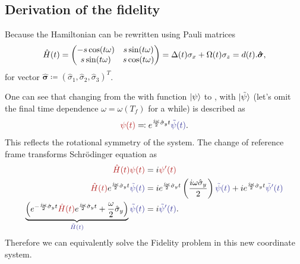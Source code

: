 \subsection{Derivation of the fidelity}
Because the Hamiltonian can be rewritten using Pauli matrices
\begin{equation}
    \hat{H}(t) = 
        \begin{pmatrix}
         -s \cos (t \omega ) & s \sin (t \omega ) \\
         s \sin (t \omega ) & s \cos (t \omega ) \\
        \end{pmatrix}
        =\Delta(t)\sigma_x+ \Omega(t)\sigma_z= d(t).\mathbf{\hat{\bm\sigma}},
\end{equation}
for vector $\hat{\bm\sigma}\coloneqq (\hat\sigma_1,\hat\sigma_2,\hat\sigma_3)^T$.

One can see that changing from the  with function $\ket{\psi}$ to , with $\ket{\tilde\psi}$ (let's omit the final time dependence $\omega=\omega(T_f)$ for a while) is described as
\begin{equation}
    \redd{\psi(t)} \eqqcolon \expsp \bluee{\tilde\psi(t)}.
\end{equation}
This reflects the rotational symmetry of the system. The change of reference frame transforms Schr\"odinger equation as
\begin{equation}
    \begin{split}
        \redd{\HH(t)\psi(t)} &= i\redd{\psi'(t)}\\
        \redd{\HH(t)} \expsp\bluee{\tilde\psi(t)} &= i \expsp \left(\frac{i\omega\hat\sigma_y}{2}\right)\bluee{\tilde\psi(t)}+i\expsp\bluee{\tilde\psi'(t)}\\
        \underbrace{\left(\expsm \redd{\HH(t)}\expsp+ \frac{\omega}{2}\hat\sigma_y\right)}_{\bluee{\tilde H(t)}}\bluee{\tilde\psi(t)}&=i\bluee{\tilde\psi'(t)}.
    \end{split}
\end{equation}
Therefore we can equivalently solve the Fidelity problem in this new coordinate system.

